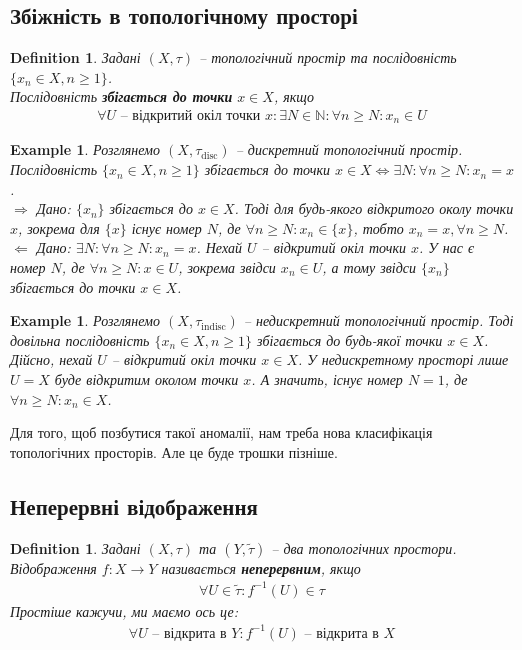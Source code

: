 \documentclass[a4paper, 10pt]{article}
\def\rightproof{$\boxed{\Rightarrow}$ }
\def\leftproof{$\boxed{\Leftarrow}$ }
\theoremstyle{theoremdd}
\newtheorem{definition}[theorem]{Definition}
\newtheorem{example}[theorem]{Example}
\begin{document}
\subsection{Збіжність в топологічному просторі}
\begin{definition}
Задані $(X,\tau)$ -- топологічний простір та послідовність $\{x_n \in X, n \geq 1\}$.\\
Послідовність \textbf{збігається до точки} $x \in X$, якщо
\begin{align*}
\forall U \text{ -- відкритий окіл точки } x: \exists N \in \mathbb{N}: \forall n \geq N: x_n \in U
\end{align*}
\end{definition}

\begin{example}
Розглянемо $(X,\tau_{\text{disc}})$ -- дискретний топологічний простір.\\
Послідовність $\{x_n \in X, n \geq 1\}$ збігається до точки $x \in X \iff \exists N: \forall n \geq N: x_n = x$.\\
\rightproof Дано: $\{x_n\}$ збігається до $x \in X$. Тоді для будь-якого відкритого околу точки $x$, зокрема для $\{x\}$ існує номер $N$, де $\forall n \geq N: x_n \in \{x\}$, тобто $x_n = x, \forall n \geq N$.
\bigskip \\
\leftproof Дано: $\exists N: \forall n \geq N: x_n = x$. Нехай $U$ -- відкритий окіл точки $x$. У нас є номер $N$, де $\forall n \geq N: x \in U$, зокрема звідси $x_n \in U$, а тому звідси $\{x_n\}$ збігається до точки $x \in X$.
\end{example}

\begin{example}
Розглянемо $(X,\tau_{\text{indisc}})$ -- недискретний топологічний простір. Тоді довільна послідовність $\{x_n \in X, n \geq 1\}$ збігається до будь-якої точки $x \in X$.\\
Дійсно, нехай $U$ -- відкритий окіл точки $x \in X$. У недискретному просторі лише $U = X$ буде відкритим околом точки $x$. А значить, існує номер $N =1$, де $\forall n \geq N: x_n \in X$.
\end{example}

\noindent Для того, щоб позбутися такої аномалії, нам треба нова класифікація топологічних просторів. Але це буде трошки пізніше.

\subsection{Неперервні відображення}
\begin{definition}
Задані $(X,\tau)$ та $(Y,\tilde{\tau})$ -- два топологічних простори.\\
Відображення $f \colon X \to Y$ називається \textbf{неперервним}, якщо
\begin{align*}
\forall U \in \tilde{\tau} : f^{-1}(U) \in \tau
\end{align*}
Простіше кажучи, ми маємо ось це:
\begin{align*}
\forall U \text{ -- відкрита в } Y: f^{-1}(U) \text{ -- відкрита в } X
\end{align*}
\end{definition}
\end{document}
